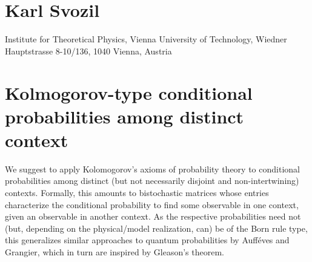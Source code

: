 \documentclass[english]{article}
\begin{document}
\thispagestyle{empty}

\section*{Karl Svozil}

Institute for Theoretical Physics,
Vienna  University of Technology,
Wiedner Hauptstrasse 8-10/136,
1040 Vienna,  Austria

\section*{Kolmogorov-type conditional probabilities among distinct context}

We suggest to apply Kolomogorov's axioms of probability theory to conditional probabilities among distinct (but not necessarily disjoint and non-intertwining) contexts. Formally, this amounts to bistochastic matrices whose entries characterize the conditional probability to find some observable in one context, given an observable in another context. As the respective probabilities need not (but, depending on the physical/model realization, can) be of the Born rule type, this generalizes similar approaches to quantum probabilities by Auff\'eves and Grangier, which in turn are inspired by Gleason's theorem.
\end{document}
